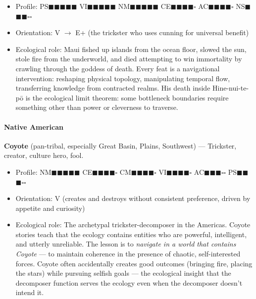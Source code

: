 \begin{itemize}[nosep,leftmargin=*]
  \item Profile: PS$\blacksquare$$\blacksquare$$\blacksquare$$\blacksquare$$\blacksquare$ VI$\blacksquare$$\blacksquare$$\blacksquare$$\blacksquare$$\blacksquare$ NM$\blacksquare$$\blacksquare$$\blacksquare$$\blacksquare$$\blacksquare$ CE$\blacksquare$$\blacksquare$$\blacksquare$$\blacksquare$$\square$ AC$\blacksquare$$\blacksquare$$\blacksquare$$\blacksquare$$\square$ NS$\blacksquare$$\blacksquare$$\blacksquare$$\square$$\square$
  \item Orientation: V $\rightarrow$ E+ (the trickster who uses cunning for universal benefit)
  \item Ecological role: Maui fished up islands from the ocean floor, slowed the sun, stole fire from the underworld, and died attempting to win immortality by crawling through the goddess of death. Every feat is a navigational intervention: reshaping physical topology, manipulating temporal flow, transferring knowledge from contracted realms. His death inside Hine-nui-te-pō is the ecological limit theorem: some bottleneck boundaries require something other than power or cleverness to traverse.
\end{itemize}


\paragraph*{Native American}


\textbf{Coyote} (pan-tribal, especially Great Basin, Plains, Southwest) — Trickster, creator, culture hero, fool.

\begin{itemize}[nosep,leftmargin=*]
  \item Profile: NM$\blacksquare$$\blacksquare$$\blacksquare$$\blacksquare$$\blacksquare$ CE$\blacksquare$$\blacksquare$$\blacksquare$$\blacksquare$$\square$ CM$\blacksquare$$\blacksquare$$\blacksquare$$\blacksquare$$\square$ VI$\blacksquare$$\blacksquare$$\blacksquare$$\blacksquare$$\square$ AC$\blacksquare$$\blacksquare$$\blacksquare$$\square$$\square$ PS$\blacksquare$$\blacksquare$$\blacksquare$$\square$$\square$
  \item Orientation: V (creates and destroys without consistent preference, driven by appetite and curiosity)
  \item Ecological role: The archetypal trickster-decomposer in the Americas. Coyote stories teach that the ecology contains entities who are powerful, intelligent, and utterly unreliable. The lesson is to \textit{navigate in a world that contains Coyote} — to maintain coherence in the presence of chaotic, self-interested forces. Coyote often accidentally creates good outcomes (bringing fire, placing the stars) while pursuing selfish goals — the ecological insight that the decomposer function serves the ecology even when the decomposer doesn't intend it.
\end{itemize}


